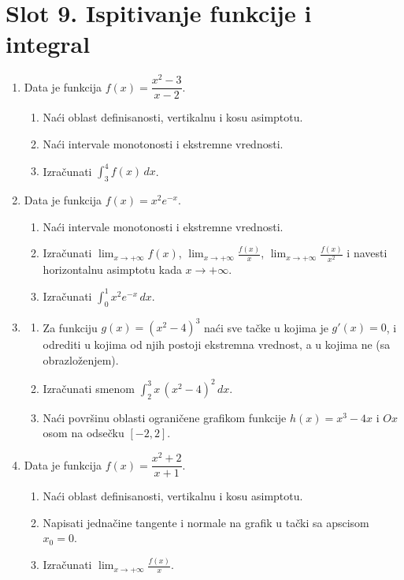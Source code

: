 \section*{Slot 9. Ispitivanje funkcije i integral}
\begin{enumerate}[label=\arabic*.]
  \item Data je funkcija $f(x)=\dfrac{x^2-3}{x-2}$.
  \begin{enumerate}[label=\alph*)]
    \item Naći oblast definisanosti, vertikalnu i kosu asimptotu.
    \item Naći intervale monotonosti i ekstremne vrednosti.
    \item Izračunati $\displaystyle\int_{3}^{4} f(x)\,dx$.
  \end{enumerate}

  \item Data je funkcija $f(x)=x^2 e^{-x}$.
  \begin{enumerate}[label=\alph*)]
    \item Naći intervale monotonosti i ekstremne vrednosti.
    \item Izračunati $\displaystyle\lim_{x\to+\infty} f(x)$, $\displaystyle\lim_{x\to+\infty}\frac{f(x)}{x}$, $\displaystyle\lim_{x\to+\infty}\frac{f(x)}{x^2}$ i navesti horizontalnu asimptotu kada $x\to+\infty$.
    \item Izračunati $\displaystyle\int_{0}^{1} x^2 e^{-x}\,dx$.
  \end{enumerate}

  \item \begin{enumerate}[label=\alph*)]
    \item Za funkciju $g(x)=(x^2-4)^3$ naći sve tačke u kojima je $g'(x)=0$, i odrediti u kojima od njih postoji ekstremna vrednost, a u kojima ne (sa obrazloženjem).
    \item Izračunati smenom $\displaystyle\int_{2}^{3} x\,(x^2-4)^2\,dx$.
    \item Naći površinu oblasti ograničene grafikom funkcije $h(x)=x^3-4x$ i $Ox$ osom na odsečku $[-2,2]$.
  \end{enumerate}

  \item Data je funkcija $f(x)=\dfrac{x^2+2}{x+1}$.
  \begin{enumerate}[label=\alph*)]
    \item Naći oblast definisanosti, vertikalnu i kosu asimptotu.
    \item Napisati jednačine tangente i normale na grafik u tački sa apscisom $x_0=0$.
    \item Izračunati $\displaystyle\lim_{x\to+\infty}\frac{f(x)}{x}$.
  \end{enumerate}


\end{enumerate}
